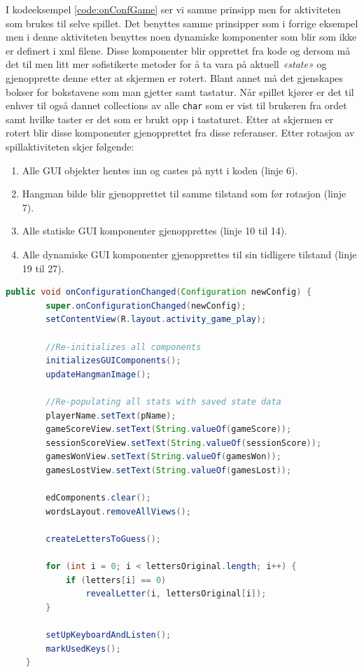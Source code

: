 I kodeeksempel \ref{code:onConfGame} ser vi samme prinsipp men for aktiviteten som brukes til selve spillet. Det benyttes samme prinsipper som i forrige eksempel men i denne aktiviteten benyttes noen dynamiske komponenter som blir som ikke er definert i xml filene. Disse komponenter blir opprettet fra kode og dersom må det til men litt mer sofistikerte metoder for å ta vara på aktuell \textit{«state»} og gjenopprette denne etter at skjermen er rotert. Blant annet må det gjenskapes bokser for bokstavene som man gjetter samt tastatur. Når spillet kjører er det til enhver til også dannet collections av alle \texttt{char} som er vist til brukeren fra ordet samt hvilke taster er det som er brukt opp i tastaturet. Etter at skjermen er rotert blir disse komponenter gjenopprettet fra disse referanser. Etter rotasjon av spillaktiviteten skjer følgende:
\begin{enumerate}
\item Alle GUI objekter hentes inn og castes på nytt i koden (linje 6).
\item Hangman bilde blir gjenopprettet til samme tilstand som før rotasjon (linje 7).
\item Alle statiske GUI komponenter gjenopprettes (linje 10 til 14).
\item Alle dynamiske GUI komponenter gjenopprettes til sin tidligere tilstand (linje 19 til 27).
\end{enumerate}

\begin{lstlisting}[language=Java, caption=Håndtering av rotasjon i \texttt{GamePlayActivity.java}, label=code:onConfGame]
    public void onConfigurationChanged(Configuration newConfig) {
        super.onConfigurationChanged(newConfig);
        setContentView(R.layout.activity_game_play);

        //Re-initializes all components
        initializesGUIComponents();
        updateHangmanImage();

        //Re-populating all stats with saved state data
        playerName.setText(pName);
        gameScoreView.setText(String.valueOf(gameScore));
        sessionScoreView.setText(String.valueOf(sessionScore));
        gamesWonView.setText(String.valueOf(gamesWon));
        gamesLostView.setText(String.valueOf(gamesLost));

        edComponents.clear();
        wordsLayout.removeAllViews();

        createLettersToGuess();

        for (int i = 0; i < lettersOriginal.length; i++) {
            if (letters[i] == 0)
                revealLetter(i, lettersOriginal[i]);
        }
        
        setUpKeyboardAndListen();
        markUsedKeys();
    }
\end{lstlisting}

